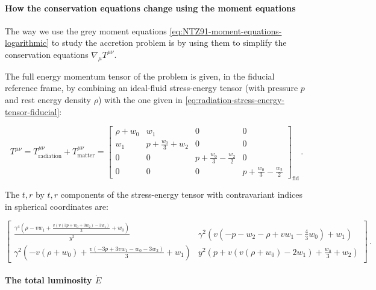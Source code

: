 \documentclass[main.tex]{subfiles}
\begin{document}
\paragraph{How the conservation equations change using the moment equations}

The way we use the grey moment equations \eqref{eq:NTZ91-moment-equations-logarithmic} to study the accretion problem is by using them to simplify the conservation equations \(\nabla_\mu T^{\mu\nu}\).

The full energy momentum tensor of the problem is given, in the fiducial reference frame, by combining an ideal-fluid stress-energy tensor (with pressure \(p\) and rest energy density \(\rho\)) with the one given in \eqref{eq:radiation-stress-energy-tensor-fiducial}:

\begin{equation}
    T^{\mu\nu} =
    T^{\mu\nu}_{\text{radiation}} +
    T^{\mu\nu}_{\text{matter}} =
    \left[\begin{matrix}\rho + w_{0} & w_{1} & 0 & 0\\w_{1} & p + \frac{w_{0}}{3} + w_{2} & 0 & 0\\0 & 0 & p + \frac{w_{0}}{3} - \frac{w_{2}}{2} & 0\\0 & 0 & 0 & p + \frac{w_{0}}{3} - \frac{w_{2}}{2}\end{matrix}\right] _{\text{fid}}\,.
\end{equation}

The \(t,r\) by \(t, r\) components of the stress-energy tensor with contravariant indices in spherical coordinates are:

\begin{equation} \label{eq:spherical-coordinates-full-stress-energy-tensor}
      \left[
      \begin{matrix}
      \frac{\gamma^{4} \left(\rho - v w_{1} + \frac{v \left(v \left(3 p + w_{0} + 3 w_{2}\right) - 3 w_{1}\right)}{3} + w_{0}\right)}{y^{2}} &
      \gamma^{2} \left(v \left( -p - w_{2} - \rho + v w_{1} - \frac{4}{3} w_{0}\right) + w_{1}\right)\\
      \gamma^{2} \left(- v \left(\rho + w_{0}\right) + \frac{v \left(- 3 p + 3 v w_{1} - w_{0} - 3 w_{2}\right)}{3} + w_{1}\right) &
      y^{2} \left(p+ v \left(v \left(\rho + w_{0}\right) -2w_1 \right) + \frac{w_{0}}{3} + w_{2}\right)
    \end{matrix}
      \right] \,.
\end{equation}

\paragraph{The total luminosity \(\dot{E}\)}
\end{document}

